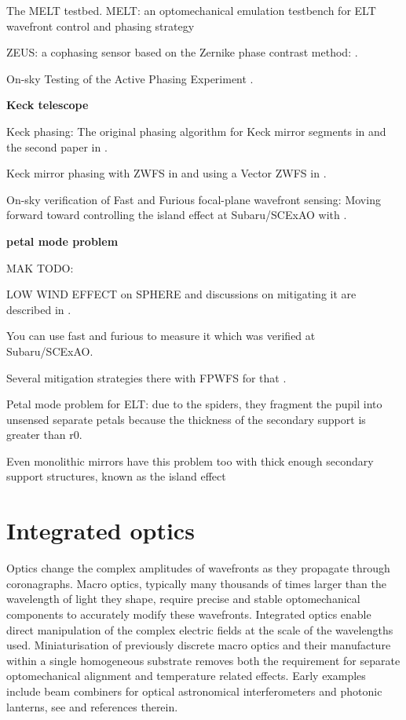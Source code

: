 \documentclass[letterpaper]{ar-1col}
\begin{document}
The MELT testbed. MELT: an optomechanical emulation testbench for ELT wavefront control and phasing strategy \citep{Pfrommer18}

ZEUS: a cophasing sensor based on the Zernike phase contrast method: \citep{Dohlen06}.

On-sky Testing of the Active Phasing Experiment  \citet{Gonte09}.

{\bf Keck telescope}

Keck phasing: The original phasing algorithm for Keck mirror segments in \citet{Chanan98} and the second paper in \citet{Chanan00}.

Keck mirror phasing with ZWFS in \citet{vanKooten22} and using a Vector ZWFS in \citet{Salama24}.

On-sky verification of Fast and Furious focal-plane wavefront sensing: Moving forward toward controlling the island effect at Subaru/SCExAO with \citet{Bos20}.

{\bf petal mode problem}

MAK TODO:

LOW WIND EFFECT on SPHERE \citep{Sauvage16} and discussions on mitigating it are described in \citet{Milli18}.

You can use fast and furious to measure it \citep{Wilby18} which was verified at Subaru/SCExAO.

Several mitigation strategies there with FPWFS for that \citep{Vievard19}.

Petal mode problem for ELT: due to the spiders, they fragment the pupil into unsensed separate petals because the thickness of the secondary support is greater than r0.

Even monolithic mirrors have this problem too with thick enough secondary support structures, known as the island effect \citep{Leboulleux22,Leboulleux22a}

\section{Integrated optics}

Optics change the complex amplitudes of wavefronts as they propagate through coronagraphs.
%
Macro optics, typically many thousands of times larger than the wavelength of light they shape, require precise and stable optomechanical components to accurately modify these wavefronts.
%
Integrated optics enable direct manipulation of the complex electric fields at the scale of the wavelengths used.
%
Miniaturisation of previously discrete macro optics and their manufacture within a single homogeneous substrate removes both the requirement for separate optomechanical alignment and temperature related effects.
%
Early examples include beam combiners for optical astronomical interferometers \citep[for example the IOTA/IONIC beam combiner ][]{Berger01} and photonic lanterns, see \citet{Leon-Saval10} and references therein.
\end{document}
